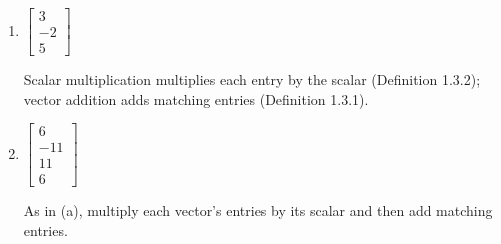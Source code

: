 \begin{solution}
\begin{enumerate}
  \item
       \begin{answer}
         $\begin{bmatrix} 3 \\ -2 \\ 5 \end{bmatrix}$
       \end{answer}
       Scalar multiplication multiplies each entry by the scalar (Definition 1.3.2); vector addition adds matching entries (Definition 1.3.1).
     \item
       \begin{answer}
         $\begin{bmatrix} 6 \\ -11 \\ 11 \\ 6 \end{bmatrix}$
       \end{answer}
       As in (a), multiply each vector's entries by its scalar and then add matching entries.
\end{enumerate}
\end{solution}

